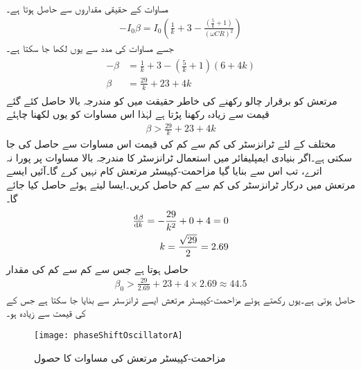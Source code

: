 مساوات  کے حقیقی مقداروں سے حاصل ہوتا ہے۔
\begin{align*}
-I_0 \beta = I_0 \left(\frac{1}{k}+3-\frac{\left(\frac{5}{k}+1 \right)}{\left(\omega C R \right)^2} \right)
\end{align*}
جسے مساوات  کی مدد سے یوں لکھا جا سکتا ہے۔
\begin{gather}
\begin{aligned}\label{مساوات_مرتعش_مزاحمت_کپیسٹر_درکار_افزائش}
-\beta &= \frac{1}{k}+3-\left(\frac{5}{k}+1 \right) \left(6+4 k \right) \\
\beta &=\frac{29}{k}+23+4 k
\end{aligned}
\end{gather}
مرتعش کو برقرار چالو رکھنے کی خاطر حقیقت میں  کو مندرجہ بالا حاصل کئے گئے قیمت سے زیادہ رکھنا پڑتا ہے لہٰذا اس مساوات کو یوں لکھنا چاہئے
\begin{align}
\beta > \frac{29}{k}+23+4 k
\end{align}
مختلف  کے لئے ٹرانزسٹر کی کم سے کم  کی قیمت اس مساوات سے حاصل کی جا سکتی ہے۔اگر بنیادی ایمپلیفائر میں استعمال ٹرانزسٹر کا  مندرجہ بالا مساوات پر پورا نہ اترے، تب اس سے  بنایا گیا مزاحمت-کپیسٹر مرتعش کام نہیں کرے گا۔آئیں ایسے مرتعش میں درکار ٹرانزسٹر کی کم سے کم  حاصل کریں۔ایسا  لیتے ہوئے حاصل کیا جائے گا۔
 \begin{align*}
\od{\beta}{k} = - \frac{29}{k^2}+0 +4 =\num{0}\\
k=\frac{\sqrt{29}}{2}=\num{2.69}
\end{align*}
حاصل ہوتا ہے جس سے کم سے کم  کی مقدار
\begin{align*}
\beta_0 > \frac{29}{2.69}+23+4 \times 2.69 \approx \num{44.5}
\end{align*}
حاصل ہوتی ہے۔یوں  رکھتے ہوئے مزاحمت-کپیسٹر مرتعش ایسے ٹرانزسٹر سے بنایا جا سکتا ہے جس کے  کی قیمت  سے زیادہ ہو۔
\begin{figure}
\centering
\texttt{[image: phaseShiftOscillatorA]}
\caption{مزاحمت-کپیسٹر مرتعش کی مساوات کا حصول}
\label{شکل_مزاحمت_کپیسٹر_مرتعش_الف}
\end{figure}
